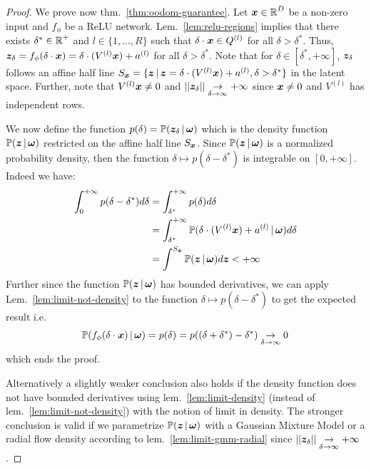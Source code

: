 \begin{proof}
We prove now thm.~\ref{thm:oodom-guarantee}. Let $\bm{x} \in \operatorname{\mathbb{R}}^D $ be a non-zero input and $f_{\phi}$ be a ReLU network. Lem.~\ref{lem:relu-regions} implies that there exists $\delta^* \in \operatorname{\mathbb{R}}^{+}$ and $l \in \{1,..., R\}$ such that $\delta \cdot \bm{x} \in Q^{(l)}$ for all $\delta > \delta^*$. Thus, $\bm{z}_{\delta} = f_{\phi}(\delta \cdot \bm{x}) = \delta \cdot (V^{(l)} \bm{x}) + a^{(l)}$ for all $\delta > \delta^*$. Note that for $\delta\in [\delta^*, +\infty]$,  $\bm{z}_{\delta}$ follows an affine half line $S_{\bm{x}} = \{\bm{z} \,|\, \bm{z} = \delta \cdot (V^{(l)} \bm{x}) + a^{(l)}, \delta > \delta^* \}$ in the latent space. Further, note that $V^{(l)}\bm{x} \neq 0$ and $|| \bm{z}_\delta|| \underset{\delta \rightarrow \infty}{\rightarrow} + \infty$ since $\bm{x} \neq 0$ and $V^{(l)}$ has independent rows.

We now define the function $p(\delta)=\mathbb{P}(\bm{z}_{\delta} \,|\, \bm{\omega})$ which is the density function $\mathbb{P}(\bm{z} \,|\, \bm{\omega})$ restricted on the affine half line $S_{\bm{x}}$. Since $\mathbb{P}(\bm{z} \,|\, \bm{\omega})$ is a normalized probability density, then the function $\delta \mapsto p(\delta - \delta^*)$ is integrable on $[0, +\infty]$. Indeed we have:
\begin{align*}
    \int_{0}^{+\infty} p(\delta - \delta^*) d\delta &= \int_{\delta^*}^{+\infty} p(\delta) d\delta \\
    &= \int_{\delta^*}^{+\infty} \mathbb{P}(\delta \cdot (V^{(l)} \bm{x}) + a^{(l)} \,|\, \bm{\omega}) d\delta\\
    &= \int^{S_{\bm{x}}} \mathbb{P}(\bm{z} \,|\, \bm{\omega}) d\bm{z} < +\infty
\end{align*}
Further since the function $\mathbb{P}(\bm{z} \,|\, \bm{\omega})$ has bounded derivatives, we can apply  Lem.~\ref{lem:limit-not-density} to the function $\delta \mapsto p(\delta - \delta^*)$ to get the expected result i.e.
\begin{align*}
    \mathbb{P}(f_{\phi}(\delta \cdot \bm{x}) \,|\, \bm{\omega}) = p(\delta) = p((\delta + \delta^*) - \delta^*) \underset{\delta \rightarrow \infty}{\rightarrow} 0
\end{align*}
which ends the proof.

Alternatively a slightly weaker conclusion also holds if the density function does not have bounded derivatives using lem.~\ref{lem:limit-density} (instead of lem.~\ref{lem:limit-not-density}) with the notion of limit in density. The stronger conclusion is valid if we parametrize $\mathbb{P}(\bm{z} \,|\, \bm{\omega})$ with a Gaussian Mixture Model or a radial flow density according to lem.~\ref{lem:limit-gmm-radial} since $|| \bm{z}_\delta|| \underset{\delta \rightarrow \infty}{\rightarrow} + \infty$.
\end{proof}

